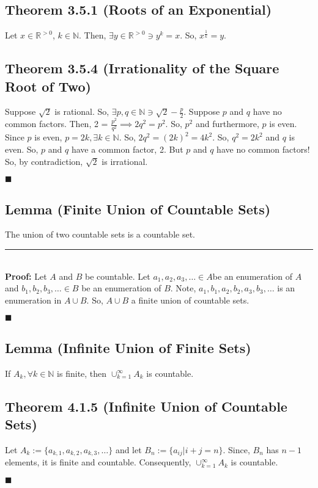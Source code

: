 \documentclass[11pt]{book}
\newcommand{\R}{\mathbb{R}}
\newcommand{\N}{\mathbb{N}}
\newcommand{\horline}{\noindent\rule{14.25cm}{0.6pt}\\}
\newcommand{\QED}{\begin{flushright}$\blacksquare$\end{flushright}}
\begin{document}
	\subsection{Theorem 3.5.1 (Roots of an Exponential)}
	\label{subsec:theor351}
		\begin{theor}
			Let $x \in \R^{>0}$, $k \in \N$. Then, $\exists y \in \R^{>0} \ni y^k = x$. So, $x^{\frac{1}{k}} = y$.
		\end{theor}
	\subsection{Theorem 3.5.4 (Irrationality of the Square Root of Two)}
	\label{subsec:theor354}
		\begin{theor}
			Suppose $\sqrt{2}$ is rational. So, $\exists p,q \in \N \ni \sqrt{2} - \frac{p}{2}$. Suppose $p$ and $q$ have no common factors. Then, 2 = $\frac{p^2}{q^2} \implies 2q^2 = p^2$.
			So, $p^2$ and furthermore, $p$ is even. Since $p$ is even, $p = 2k, \exists k \in \N$. So, $2q^2 = (2k)^2 = 4k^2$. So, $q^2 = 2k^2$ and $q$ is even.
			So, $p$ and $q$ have a common factor, 2. But $p$ and $q$ have no common factors! So, by contradiction, $\sqrt{2}$ is irrational.\QED
		\end{theor}			
		\subsection{Lemma (Finite Union of Countable Sets)}
		\label{subsec:finiteunionofcountablesets}
			\begin{lemm}
				The union of two countable sets is a countable set.\hfill\break
				\horline
				\textbf{Proof:} Let $A$ and $B$ be countable. Let $a_1,a_2,a_3,\dots \in A$be an enumeration of $A$ and $b_1,b_2,b_3,\dots \in B$ be
				an enumeration of $B$. Note, $a_1,b_1,a_2,b_2,a_3,b_3,\dots$ is an enumeration in $A \cup B$. So, $A \cup B$ a finite union of countable sets. \QED
			\end{lemm}
	\subsection{Lemma (Infinite Union of Finite Sets)}			
	\label{subsec:infiniteunionoffinitesets}
		\begin{lemm}
			If $A_k, \forall k \in \N$ is finite, then $\displaystyle\cup_{k=1}^{\infty}{A_k}$ is countable.
		\end{lemm}

	\subsection{Theorem 4.1.5 (Infinite Union of Countable Sets)}
	\label{subsec:theor415}
		\begin{theor}
			Let $A_k := \{a_{k,1}, a_{k,2}, a_{k,3},\dots \}$ and let $B_n := \{a_{ij} | i+j = n\}$. Since, $B_n$ has $n-1$ elements, it is finite and countable.
			Consequently, $\displaystyle\cup_{k=1}^{\infty}{A_k}$ is countable. \QED
		\end{theor}
	\newpage
\end{document}
